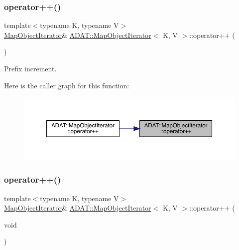 \subsubsection{\texorpdfstring{operator++()}{operator++()}\hspace{0.1cm}{\footnotesize\ttfamily [1/6]}}
{\footnotesize\ttfamily template$<$typename K, typename V$>$ \\
\mbox{\hyperlink{classADAT_1_1MapObjectIterator}{Map\+Object\+Iterator}}\& \mbox{\hyperlink{classADAT_1_1MapObjectIterator}{A\+D\+A\+T\+::\+Map\+Object\+Iterator}}$<$ K, V $>$\+::operator++ (\begin{DoxyParamCaption}{ }\end{DoxyParamCaption})\hspace{0.3cm}{\ttfamily [inline]}}



Prefix increment. 

Here is the caller graph for this function\+:
\nopagebreak
\begin{figure}[H]
\begin{center}
\leavevmode
\includegraphics[width=350pt]{d2/d4b/classADAT_1_1MapObjectIterator_a2eedaf3b2fc70d48afd45bd37c5e6e69_icgraph}
\end{center}
\end{figure}
\mbox{\label{classADAT_1_1MapObjectIterator_a2eedaf3b2fc70d48afd45bd37c5e6e69}} 
\subsubsection{\texorpdfstring{operator++()}{operator++()}\hspace{0.1cm}{\footnotesize\ttfamily [2/6]}}
{\footnotesize\ttfamily template$<$typename K, typename V$>$ \\
\mbox{\hyperlink{classADAT_1_1MapObjectIterator}{Map\+Object\+Iterator}}\& \mbox{\hyperlink{classADAT_1_1MapObjectIterator}{A\+D\+A\+T\+::\+Map\+Object\+Iterator}}$<$ K, V $>$\+::operator++ (\begin{DoxyParamCaption}\item[{void}]{ }\end{DoxyParamCaption})\hspace{0.3cm}{\ttfamily [inline]}}



